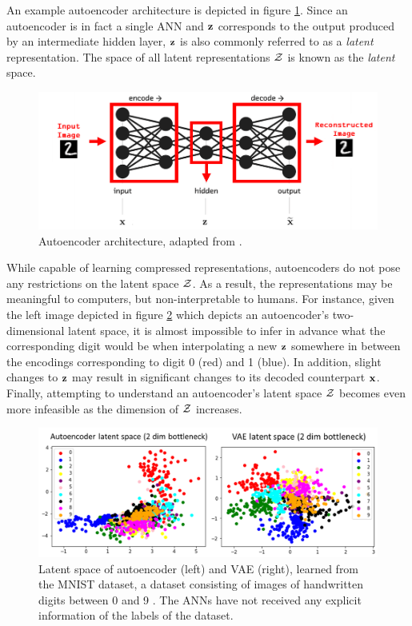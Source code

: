 An example autoencoder architecture is depicted in figure \ref{fig:autoencoder}. Since an autoencoder is in fact a single ANN and $\mathbf{z}$ corresponds to the output produced by an intermediate hidden layer, $\mathbf{z}$ is also commonly referred to as a \textit{latent} representation. The space of all latent representations $\mathcal{Z}$ is known as the \textit{latent} space.
	\begin{figure}
		\centering
		\includegraphics[width=0.7\linewidth]{autoencoder}
		\caption{Autoencoder architecture, adapted from \citep{karagiannakosHowGenerateImages2018}.}
		\label{fig:autoencoder}
	\end{figure}
While capable of learning compressed representations, autoencoders do not pose any restrictions on the latent space $\mathcal{Z}$. As a result, the representations may be meaningful to computers, but non-interpretable to humans. For instance, given the left image depicted in figure \ref{fig:latent_space_2d} which depicts an autoencoder's two-dimensional latent space, it is almost impossible to infer in advance what the corresponding digit would be when interpolating a new $\mathbf{z}$ somewhere in between the encodings corresponding to digit 0 (red) and 1 (blue). In addition, slight changes to $\mathbf{z}$ may result in significant changes to its decoded counterpart $\mathbf{x}$. Finally, attempting to understand an autoencoder's latent space $\mathcal{Z}$ becomes even more infeasible as the dimension of $\mathcal{Z}$ increases.

\begin{figure}
	\centering
	\includegraphics[width=0.7\linewidth]{screenshot021}
	\caption{ Latent space of autoencoder (left) and VAE (right), learned from the MNIST dataset, a dataset consisting of images of handwritten digits between 0 and 9 \citep{lecunGradientbasedLearningApplied1998}. The ANNs have not received any explicit information of the labels of the dataset. 
}
	\label{fig:latent_space_2d}
\end{figure}



